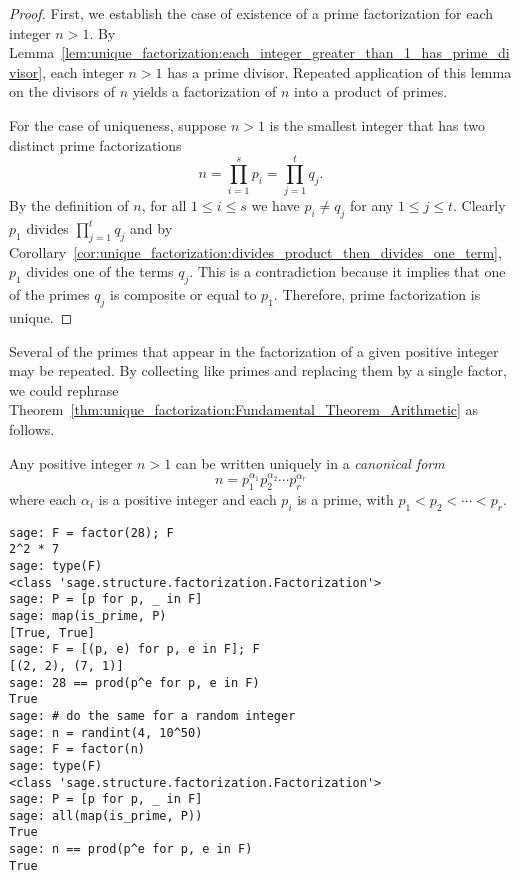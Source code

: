 \begin{proof}
First, we establish the case of existence of a prime factorization for
each integer $n > 1$. By
Lemma~\ref{lem:unique_factorization:each_integer_greater_than_1_has_prime_divisor},
each integer $n > 1$ has a prime divisor. Repeated application of this
lemma on the divisors of $n$ yields a factorization of $n$ into a
product of primes.

For the case of uniqueness, suppose $n > 1$ is the smallest integer
that has two distinct prime factorizations
\[
n
=
\prod_{i=1}^s p_i
=
\prod_{j=1}^t q_j.
\]
By the definition of $n$, for all $1 \leq i \leq s$ we have
$p_i \neq q_j$ for any $1 \leq j \leq t$. Clearly $p_1$ divides
$\prod_{j=1}^t q_j$ and by
Corollary~\ref{cor:unique_factorization:divides_product_then_divides_one_term},
$p_1$ divides one of the terms $q_j$. This is a contradiction because
it implies that one of the primes $q_j$ is composite or equal to
$p_1$. Therefore, prime factorization is unique.
\end{proof}

Several of the primes that appear in the factorization of a given
positive integer may be repeated. By collecting like primes and
replacing them by a single factor, we could rephrase
Theorem~\ref{thm:unique_factorization:Fundamental_Theorem_Arithmetic}
as follows.

\begin{corollary}
Any positive integer $n > 1$ can be written uniquely in a
\emph{canonical form}
\[
n
=
p_1^{\alpha_1} p_2^{\alpha_2} \cdots p_r^{\alpha_r}
\]
where each $\alpha_i$ is a positive integer and each $p_i$ is a prime,
with $p_1 < p_2 < \cdots < p_r$.
\end{corollary}

\begin{lstlisting}
sage: F = factor(28); F
2^2 * 7
sage: type(F)
<class 'sage.structure.factorization.Factorization'>
sage: P = [p for p, _ in F]
sage: map(is_prime, P)
[True, True]
sage: F = [(p, e) for p, e in F]; F
[(2, 2), (7, 1)]
sage: 28 == prod(p^e for p, e in F)
True
sage: # do the same for a random integer
sage: n = randint(4, 10^50)
sage: F = factor(n)
sage: type(F)
<class 'sage.structure.factorization.Factorization'>
sage: P = [p for p, _ in F]
sage: all(map(is_prime, P))
True
sage: n == prod(p^e for p, e in F)
True
\end{lstlisting}



